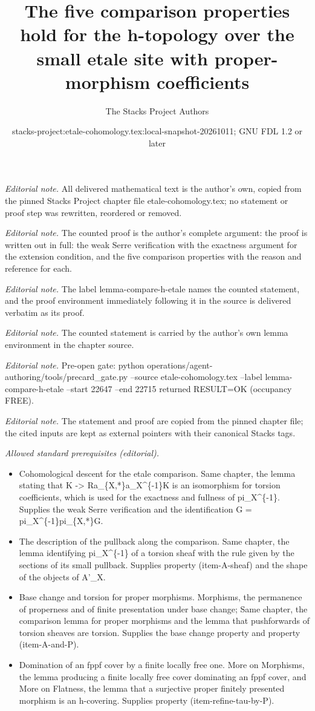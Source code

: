 \documentclass[10pt,a4paper]{amsart}
\title{The five comparison properties hold for the h-topology over the small etale site with proper-morphism coefficients}
\author{The Stacks Project Authors}
\date{stacks-project:etale-cohomology.tex:local-snapshot-20261011; GNU FDL 1.2 or later}
\theoremstyle{plain}
\theoremstyle{definition}
\theoremstyle{remark}
\numberwithin{equation}{subsection}
\begin{document}
\maketitle
\noindent\textit{Editorial note.} All delivered mathematical text is the author's own, copied from the pinned Stacks Project chapter file etale-cohomology.tex; no statement or proof step was rewritten, reordered or removed.\par\medskip
\noindent\textit{Editorial note.} The counted proof is the author's complete argument: the proof is written out in full: the weak Serre verification with the exactness argument for the extension condition, and the five comparison properties with the reason and reference for each.\par\medskip
\noindent\textit{Editorial note.} The label lemma-compare-h-etale names the counted statement, and the proof environment immediately following it in the source is delivered verbatim as its proof.\par\medskip
\noindent\textit{Editorial note.} The counted statement is carried by the author's own lemma environment in the chapter source.\par\medskip
\noindent\textit{Editorial note.} Pre-open gate: python operations/agent-authoring/tools/precard\_gate.py --source etale-cohomology.tex --label lemma-compare-h-etale --start 22647 --end 22715 returned RESULT=OK (occupancy FREE).\par\medskip
\noindent\textit{Editorial note.} The statement and proof are copied from the pinned chapter file; the cited inputs are kept as external pointers with their canonical Stacks tags.\par\medskip
\noindent\textit{Allowed standard prerequisites (editorial).}\begin{itemize}
\item Cohomological descent for the etale comparison. Same chapter, the lemma stating that K -> Ra\_\{X,*\}a\_X\textasciicircum{}\{-1\}K is an isomorphism for torsion coefficients, which is used for the exactness and fullness of pi\_X\textasciicircum{}\{-1\}. Supplies the weak Serre verification and the identification G = pi\_X\textasciicircum{}\{-1\}pi\_\{X,*\}G.
\item The description of the pullback along the comparison. Same chapter, the lemma identifying pi\_X\textasciicircum{}\{-1\} of a torsion sheaf with the rule given by the sections of its small pullback. Supplies property (item-A-sheaf) and the shape of the objects of A'\_X.
\item Base change and torsion for proper morphisms. Morphisms, the permanence of properness and of finite presentation under base change; Same chapter, the comparison lemma for proper morphisms and the lemma that pushforwards of torsion sheaves are torsion. Supplies the base change property and property (item-A-and-P).
\item Domination of an fppf cover by a finite locally free one. More on Morphisms, the lemma producing a finite locally free cover dominating an fppf cover, and More on Flatness, the lemma that a surjective proper finitely presented morphism is an h-covering. Supplies property (item-refine-tau-by-P).
\end{itemize}\medskip
\end{document}
